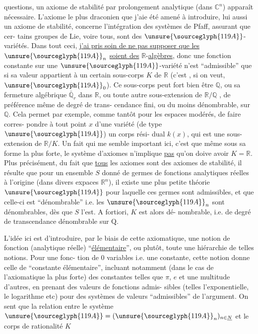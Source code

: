 
questions, un axiome de stabilité par prolongement analytique
(dans $\mathbb{C}^{n}$) apparaît nécessaire. L'axiome le plus draconien que
j'aie été amené à introduire, lui aussi un axiome de stabilité,
concerne l'intégration des systèmes de Pfaff, assurant que cer-%
tains groupes de Lie, voire tous, sont des $\unsure{\sourceglyph{119A}}$-variétés. Dans tout
ceci, \uline{j'ai pris soin de ne pas supposer que les} $\unsure{\sourceglyph{119A}}_{n}$ \uline{soient des}
\uline{$\mathbb{R}$}-\uline{algèbres}, donc une fonction constante sur une $\unsure{\sourceglyph{119A}}$-variété n'est
``admissible'' que si sa valeur appartient à un certain sous-corps
$K$ de $\mathbb{R}$ (c'est , si on veut, $\unsure{\sourceglyph{119A}}_{0}$). Ce sous-corps peut fort bien
être $\mathbb{Q}$, ou sa fermeture algébrique $\bar{\mathbb{Q}}_{r}$ dans $\mathbb{R}$, ou toute autre
sous-extension de $\mathbb{R}/\mathbb{Q}$ , de préférence même de degré de trans-%
cendance fini, ou du moins dénombrable, sur $\mathbb{Q}$. Cela permet par
exemple, comme tantôt pour les espaces modérés, de faire corres-%
pondre à tout point $x$ d'une variété (de type $\unsure{\sourceglyph{119A}}$) un corps rési-%
dual $k(x)$, qui est une sous-extension de $\mathbb{R}/K$. Un fait qui me
semble important ici, c'est que même sous sa forme la plus forte,
le système d'axiomes n'implique \uline{pas} qu'on doive avoir $K = \mathbb{R}$. Plus
précisément, du fait que \uline{tous} les axiomes sont des axiomes de
stabilité, il résulte que pour un ensemble $S$ donné de germes
de fonctions analytiques réelles à l'origine (dans divers expaces
$\mathbb{R}^{n}$), il existe une plus petite théorie $\unsure{\sourceglyph{119A}}$ pour laquelle ces germes
sont admissibles, et que celle-ci est ``dénombrable'' i.e. les $\unsure{\sourceglyph{119A}}_{n}$
sont dénombrables, dès que $S$ l'est. A fortiori, $K$ est alors dé-%
nombrable, i.e. de degré de transcendance dénombrable sur $\mathrm{Q}$.

L'idée ici est d'introduire, par le biais de cette
axiomatique, une notion de fonction (analytique réelle) ``\uline{élémentaire}'',
ou plutôt, toute une hiérarchie de telles notions. Pour une fonc-%
tion de 0 variables i.e. une constante, cette notion donne celle
de ``constante élémentaire'', incluant notamment (dans le cas de
l'axiomatique la plus forte) des constantes telles que $\pi$, $e$ et
une multitude d'autres, en prenant des valeurs de fonctions admis-%
sibles (telles l'exponentielle, le logarithme etc) pour des systèmes
de valeurs ``admissibles'' de l'argument. On sent que la relation
entre le système $\unsure{\sourceglyph{119A}} = (\unsure{\sourceglyph{119A}}_{n})_{n\in\underline{N}}$ et le corps de rationalité $K$

